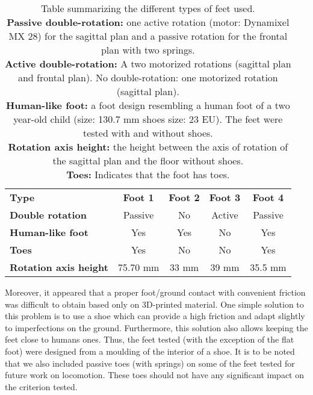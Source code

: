 \begin{table}
    \begin{center}
        \begin{tabular}{ l c c c c }
        \hline
        \textbf{Type} & \textbf{Foot 1} & \textbf{Foot 2} & \textbf{Foot 3} & \textbf{Foot 4}\\
        \textbf{Double rotation} & Passive & No & Active & Passive\\
        \textbf{Human-like foot} & Yes & Yes & No & Yes\\
        \textbf{Toes} & Yes & No & No & Yes\\
        \textbf{Rotation axis height} & 75.70 mm & 33 mm & 39 mm & 35.5 mm\\
        \hline

        \end{tabular}
        \caption{Table summarizing the different types of feet used.\\
        \textbf{Passive double-rotation:}  one active rotation (motor: Dynamixel MX 28) for the sagittal plan and a passive rotation for the frontal plan with two springs.\\
        \textbf{Active double-rotation:}  A two motorized rotations (sagittal plan and frontal plan). No double-rotation:  one motorized rotation (sagittal plan).\\
        \textbf{Human-like foot:} a foot design resembling a human foot of a two year-old child (size: 130.7 mm shoes size: 23 EU). The feet were tested with and without shoes.\\
        \textbf{Rotation axis height:} the height between the axis of rotation of the sagittal plan and the floor without shoes.\\
        \textbf{Toes:} Indicates that the foot has toes.
        }
        \label{tab:table_feet}
    \end{center}
\end{table}


Moreover, it appeared that a proper foot/ground contact with convenient friction was difficult to obtain based only on 3D-printed material. One simple solution to this problem is to use a shoe which can provide a high friction and adapt slightly to imperfections on the ground. Furthermore, this solution also allows keeping the feet close to humans ones. Thus, the feet tested (with the exception of the flat foot) were designed from a moulding of the interior of a shoe. It is to be noted that we also included passive toes (with springs) on some of the feet tested for future work on locomotion. These toes should not have any significant impact on the criterion tested.


